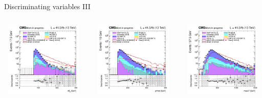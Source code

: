 \documentclass[8pt]{beamer}
\begin{document}
\begin{frame}{Discriminating variables III}
\begin{columns}
\begin{column}{1.09\textwidth}
\begin{block}{}\end{block} \vspace{5pt}
\end{column}
\end{columns} \vspace{-5pt}
\begin{columns}
		\begin{column}{0.33\textwidth}
			\begin{center}
     			\includegraphics[width=1.0\textwidth, height=100pt]{figs/2017/SmearSR-ttDM-scalar100/log_cratio_topCR_ll_mt2ll.png}
    		\end{center}		
		\end{column} 
		\begin{column}{0.33\textwidth}
			\begin{center}
     			\includegraphics[width=1.0\textwidth, height=100pt]{figs/2017/SmearSR-ttDM-scalar100/log_cratio_topCR_ll_METcorrected_pt.png}
    		\end{center}		
		\end{column} 
		\begin{column}{0.33\textwidth}
			\begin{center}
     			\includegraphics[width=1.0\textwidth, height=100pt]{figs/2017/SmearSR-ttDM-scalar100/log_cratio_topCR_ll_massT.png}

\end{center}
\end{column}
\end{columns}
\end{frame}
\end{document}
